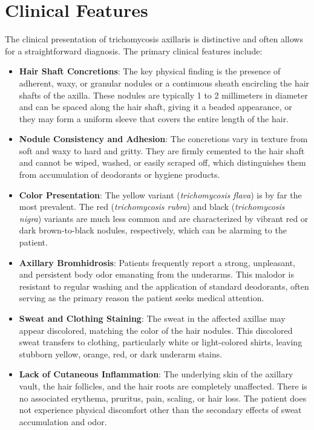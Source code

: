 \section*{Clinical Features}
The clinical presentation of trichomycosis axillaris is distinctive and often allows for a straightforward diagnosis. The primary clinical features include:
\begin{itemize}
    \item \textbf{Hair Shaft Concretions}: The key physical finding is the presence of adherent, waxy, or granular nodules or a continuous sheath encircling the hair shafts of the axilla. These nodules are typically 1 to 2 millimeters in diameter and can be spaced along the hair shaft, giving it a beaded appearance, or they may form a uniform sleeve that covers the entire length of the hair.
    \item \textbf{Nodule Consistency and Adhesion}: The concretions vary in texture from soft and waxy to hard and gritty. They are firmly cemented to the hair shaft and cannot be wiped, washed, or easily scraped off, which distinguishes them from accumulation of deodorants or hygiene products.
    \item \textbf{Color Presentation}: The yellow variant (\textit{trichomycosis flava}) is by far the most prevalent. The red (\textit{trichomycosis rubra}) and black (\textit{trichomycosis nigra}) variants are much less common and are characterized by vibrant red or dark brown-to-black nodules, respectively, which can be alarming to the patient.
    \item \textbf{Axillary Bromhidrosis}: Patients frequently report a strong, unpleasant, and persistent body odor emanating from the underarms. This malodor is resistant to regular washing and the application of standard deodorants, often serving as the primary reason the patient seeks medical attention.
    \item \textbf{Sweat and Clothing Staining}: The sweat in the affected axillae may appear discolored, matching the color of the hair nodules. This discolored sweat transfers to clothing, particularly white or light-colored shirts, leaving stubborn yellow, orange, red, or dark underarm stains.
    \item \textbf{Lack of Cutaneous Inflammation}: The underlying skin of the axillary vault, the hair follicles, and the hair roots are completely unaffected. There is no associated erythema, pruritus, pain, scaling, or hair loss. The patient does not experience physical discomfort other than the secondary effects of sweat accumulation and odor.
\end{itemize}

